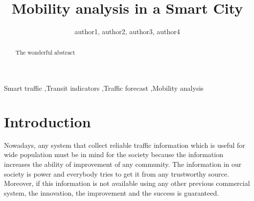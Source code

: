 \documentclass[preprint]{elsarticle}
\begin{document}
\begin{frontmatter}


\title{Mobility analysis in a Smart City}


\author{author1, author2, author3, author4}
\address{Departamento de Arquitectura y Tecnolog�a de Computadores.\\ ETSIIT - CITIC. University of Granada, Spain}


%
%
\begin{abstract}
The wonderful abstract
\end{abstract}

%
%
\begin{keyword}
Smart traffic \sep Transit indicators \sep Traffic forecast \sep Mobility analysis
\end{keyword}

\end{frontmatter}



\section{Introduction}
\label{sec:intro}

Nowadays, any system that collect reliable traffic information which is useful for wide population must be in mind for the society because the information increases the ability of improvement of any community. The information in our society is power and everybody tries to get it from any trustworthy source. Moreover, if this information is not available using any other previous commercial system, the innovation, the improvement and the success is guaranteed.
\end{document}
